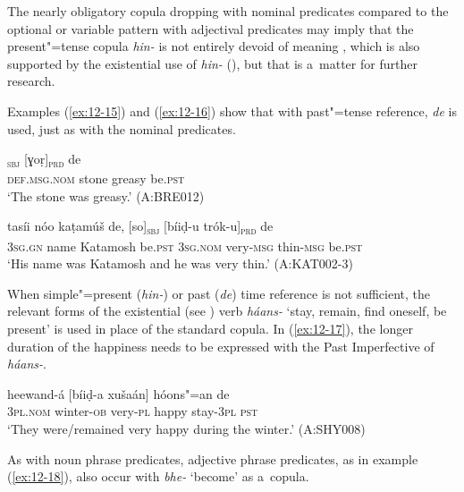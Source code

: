 The nearly obligatory copula dropping with nominal predicates compared to the optional or variable pattern with adjectival predicates may imply that the present"=tense copula \textit{hin-} is not entirely devoid of meaning \citep[8, 31, 66]{pustet2003}, which is also supported by the existential use of \textit{hin-} (), but that is a~matter for further research.



Examples (\ref{ex:12-15}) and (\ref{ex:12-16}) show that with past"=tense reference, \textit{de} is used, just as with the nominal predicates.

\begin{exe}
\ex
\label{ex:12-15}
\gll [so báaṭ]\textsubscript{\textsc{sbj}} [ɣoṛ]\textsubscript{\textsc{prd}} de \\
\textsc{def.msg.nom} stone greasy be.\textsc{pst} \\
\glt `The stone was greasy.' (A:BRE012)
\end{exe}
\begin{exe}
\ex
\label{ex:12-16}
\gll tasíi nóo kaṭamúš de, [so]\textsubscript{\textsc{sbj}} [bíiḍ-u trók-u]\textsubscript{\textsc{prd}} de \\
\textsc{3sg.gn} name Katamosh be.\textsc{pst} \textsc{3sg.nom} very-\textsc{msg}  thin-\textsc{msg} be.\textsc{pst} \\
\glt `His name was Katamosh and he was very thin.' (A:KAT002-3)
\end{exe}

When simple"=present (\textit{hin-}) or past (\textit{de}) time reference is not sufficient, the relevant forms of the existential (see ) verb \textit{háans-} `stay, remain, find oneself, be present' is used in place of the standard copula. In (\ref{ex:12-17}), the longer duration of the happiness needs to be expressed with the Past Imperfective of \textit{háans-}.

\begin{exe}
\ex
\label{ex:12-17}
\gll [se] heewand-á [bíiḍ-a xušaán] hóons"=an de \\
\textsc{3pl.nom} winter-\textsc{ob} very-\textsc{pl} happy stay-\textsc{3pl} \textsc{pst} \\
\glt `They were/remained very happy during the winter.' (A:SHY008)
\end{exe}

As with noun phrase predicates, adjective phrase predicates, as in example (\ref{ex:12-18}), also occur with \textit{bhe-} `become' as a~copula.

